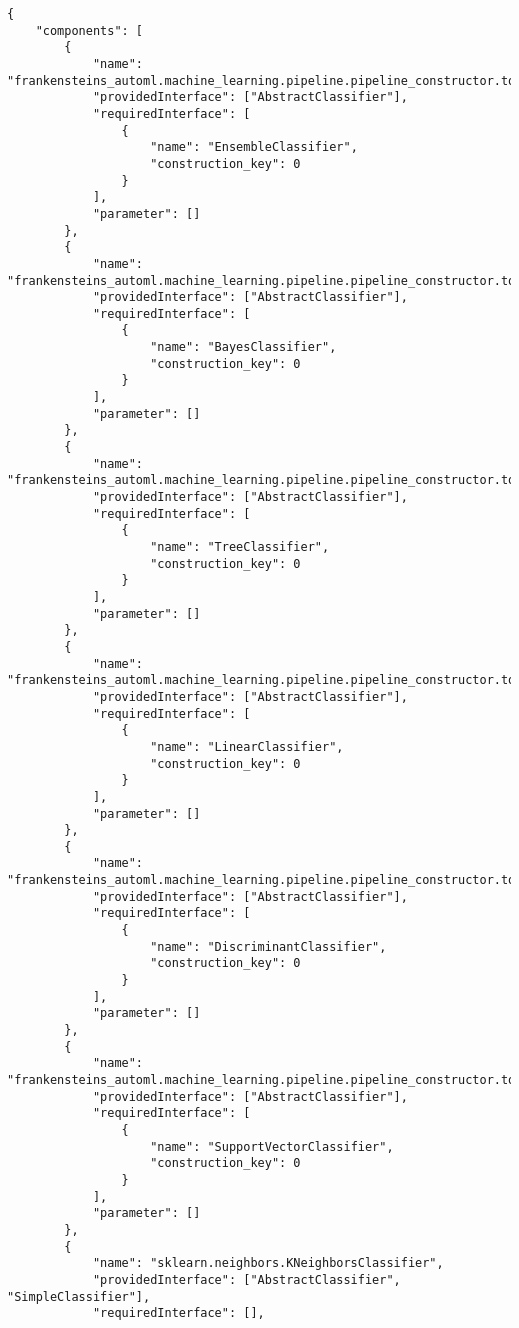 \begin{Verbatim}[fontsize=\scriptsize]
{
    "components": [
        {
            "name": "frankensteins_automl.machine_learning.pipeline.pipeline_constructor.topology_union",
            "providedInterface": ["AbstractClassifier"],
            "requiredInterface": [
                {
                    "name": "EnsembleClassifier",
                    "construction_key": 0
                }
            ],
            "parameter": []
        },
        {
            "name": "frankensteins_automl.machine_learning.pipeline.pipeline_constructor.topology_union",
            "providedInterface": ["AbstractClassifier"],
            "requiredInterface": [
                {
                    "name": "BayesClassifier",
                    "construction_key": 0
                }
            ],
            "parameter": []
        },
        {
            "name": "frankensteins_automl.machine_learning.pipeline.pipeline_constructor.topology_union",
            "providedInterface": ["AbstractClassifier"],
            "requiredInterface": [
                {
                    "name": "TreeClassifier",
                    "construction_key": 0
                }
            ],
            "parameter": []
        },
        {
            "name": "frankensteins_automl.machine_learning.pipeline.pipeline_constructor.topology_union",
            "providedInterface": ["AbstractClassifier"],
            "requiredInterface": [
                {
                    "name": "LinearClassifier",
                    "construction_key": 0
                }
            ],
            "parameter": []
        },
        {
            "name": "frankensteins_automl.machine_learning.pipeline.pipeline_constructor.topology_union",
            "providedInterface": ["AbstractClassifier"],
            "requiredInterface": [
                {
                    "name": "DiscriminantClassifier",
                    "construction_key": 0
                }
            ],
            "parameter": []
        },
        {
            "name": "frankensteins_automl.machine_learning.pipeline.pipeline_constructor.topology_union",
            "providedInterface": ["AbstractClassifier"],
            "requiredInterface": [
                {
                    "name": "SupportVectorClassifier",
                    "construction_key": 0
                }
            ],
            "parameter": []
        },
        {
            "name": "sklearn.neighbors.KNeighborsClassifier",
            "providedInterface": ["AbstractClassifier", "SimpleClassifier"],
            "requiredInterface": [],

\end{Verbatim}
